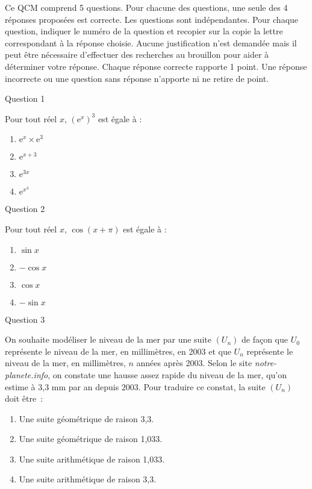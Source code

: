 
%
Ce QCM comprend 5 questions.
\newpar
Pour chacune des questions, une seule des 4 réponses proposées est correcte.
\newpar
Les questions sont indépendantes.
\newpar
Pour chaque question, indiquer le numéro de la question et recopier sur la copie la lettre correspondant à la réponse choisie.
\newpar
Aucune justification n'est demandée mais il peut être nécessaire d'effectuer des recherches au brouillon pour aider à déterminer votre réponse.
\newpar
Chaque réponse correcte rapporte 1 point. Une réponse incorrecte ou une question sans réponse n'apporte ni ne retire de point.
\newpar
\begin{h2}Question 1\end{h2}
Pour tout réel $x$,  $\left( \text{e}^{ x } \right)^{ 3 }$ est égale à :
\newpar
\begin{enumerate}[label=\alph*.]
     \item
     $\text{e}^{ x } \times \text{e}^{ 3 }$
     \item
     $\text{e}^{ x+3 }$
     \item
     $\text{e}^{ 3x }$
     \item
     $\text{e}^{ x{}^{ 3 } }$
\end{enumerate}
\begin{h2}Question 2\end{h2}
Pour tout réel $x$,  $\cos{ ( x+ \pi  ) }$ est égale à :
\newpar
\begin{enumerate}[label=\alph*.]
     \item
     $\sin{ x }$
     \item
     $ - \cos{ x }$
     \item
     $\cos{ x }$
     \item
     $ - \sin{ x }$
\end{enumerate}
\begin{h2}Question 3\end{h2}
On souhaite modéliser le niveau de la mer par une suite $\left( U_{ n } \right)$ de façon que $U_{ 0 }$ représente le niveau de la mer, en millimètres, en 2003 et que $U_{ n }$ représente le niveau de la mer, en millimètres,  $n$  années après 2003.
\newpar
Selon le site \textit{notre-planete.info}, on constate une hausse assez rapide du niveau de la mer, qu'on estime à 3,3 mm par an depuis 2003.
\newpar
Pour traduire ce constat, la suite $\left( U_{ n } \right)$ doit être~:
\newpar
\begin{enumerate}[label=\alph*.]
     \item
     Une suite géométrique de raison 3,3.
     \item
     Une suite géométrique de raison 1,033.
     \item
     Une suite arithmétique de raison 1,033.
     \item
     Une suite arithmétique de raison 3,3.
\end{enumerate}
